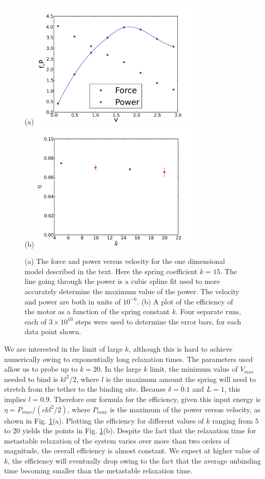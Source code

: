 \documentclass[journal = mamobx, manuscript = article]{achemso}
\begin{document}
\begin{figure}[htp]
\begin{center}
(a)\includegraphics[width=3.25in]{fvsv.k15}\\
(b)\includegraphics[width=3.25in]{maxpower}
\caption{
(a) The force and power versus velocity for the one dimensional model described
in the text. Here the spring coefficient $k=15$. The line going through the
power is a cubic spline fit used to more accurately determine the maximum value
of the power. The velocity and power are both in units of $10^{-6}$.
(b) A plot of the efficiency of the motor as a function of the spring constant
$k$. Four separate runs, each of $3\times 10^{10}$ steps were used to determine
the error bars, for each data point shown.
}
\label{fig:1dfvsv}
\end{center}
\end{figure}

We are interested in the limit of large $k$, although this is hard to achieve
numerically owing to exponentially long relaxation times. The parameters used
allow us to probe up to $k=20$. 
In the large $k$ limit, the  minimum value of $V_{min}$ needed to bind is
$k l^2 /2$, where $l$ is the maximum amount the spring will need to stretch
from the tether to the binding site. Because $\delta = 0.1$ and $L=1$, this
implies $l=0.9$. Therefore our formula for the efficiency, given this input
energy is $\eta = P_{max}/(c k l^2 /2)$, where $P_{max}$ is the maximum of the
power versus velocity, as shown in Fig. \ref{fig:1dfvsv}(a). Plotting the
efficiency for different values of $k$ ranging from $5$ to $20$ yields the
points in Fig. \ref{fig:1dfvsv}(b). 
Despite the fact that the relaxation time for metastable relaxation of the system
varies over more than two orders of magnitude, the overall efficiency is almost
constant. We expect at higher value of $k$, the efficiency will eventually drop
owing to the fact that the average unbinding time becoming smaller than the
metastable relaxation time.
\end{document}
